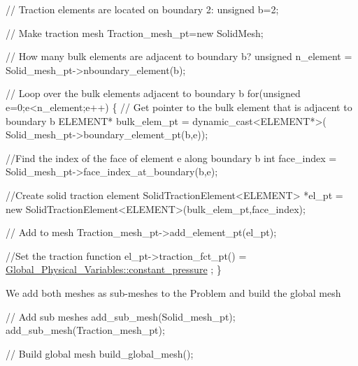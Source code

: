 \begin{DoxyCodeInclude}
 
 \textcolor{comment}{// Traction elements are located on boundary 2:}
 \textcolor{keywordtype}{unsigned} b=2;

 \textcolor{comment}{// Make traction mesh}
 Traction\_mesh\_pt=\textcolor{keyword}{new} SolidMesh;
 
 \textcolor{comment}{// How many bulk elements are adjacent to boundary b?}
 \textcolor{keywordtype}{unsigned} n\_element = Solid\_mesh\_pt->nboundary\_element(b);
 
 \textcolor{comment}{// Loop over the bulk elements adjacent to boundary b}
 \textcolor{keywordflow}{for}(\textcolor{keywordtype}{unsigned} e=0;e<n\_element;e++)
  \{
   \textcolor{comment}{// Get pointer to the bulk element that is adjacent to boundary b}
   ELEMENT* bulk\_elem\_pt = \textcolor{keyword}{dynamic\_cast<}ELEMENT*\textcolor{keyword}{>}(
    Solid\_mesh\_pt->boundary\_element\_pt(b,e));
   
   \textcolor{comment}{//Find the index of the face of element e along boundary b}
   \textcolor{keywordtype}{int} face\_index = Solid\_mesh\_pt->face\_index\_at\_boundary(b,e);
   
   \textcolor{comment}{//Create solid traction element}
   SolidTractionElement<ELEMENT> *el\_pt = 
    \textcolor{keyword}{new} SolidTractionElement<ELEMENT>(bulk\_elem\_pt,face\_index);   
   
   \textcolor{comment}{// Add to mesh}
   Traction\_mesh\_pt->add\_element\_pt(el\_pt);
 
   \textcolor{comment}{//Set the traction function}
   el\_pt->traction\_fct\_pt() = \hyperlink{namespaceGlobal__Physical__Variables_a19f4e20a92e7d216b4d2b00308f96917}{Global\_Physical\_Variables::constant\_pressure}
      ;
  \}  

\end{DoxyCodeInclude}


We add both meshes as sub-\/meshes to the {\ttfamily Problem} and build the global mesh


\begin{DoxyCodeInclude}
 
 \textcolor{comment}{// Add sub meshes}
 add\_sub\_mesh(Solid\_mesh\_pt);
 add\_sub\_mesh(Traction\_mesh\_pt);
 
 \textcolor{comment}{// Build global mesh}
 build\_global\_mesh();

\end{DoxyCodeInclude}


